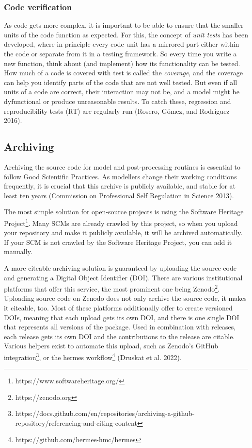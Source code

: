 \documentclass[preprint,11pt,5p]{elsarticle}
\begin{document}
\subsubsection{Code verification}\label{code-verification}

As code gets more complex, it is important to be able to ensure that the
smaller units of the code function as expected. For this, the concept of
\emph{unit tests} has been developed, where in principle every code unit
has a mirrored part either within the code or separate from it in a
testing framework. So every time you write a new function, think about
(and implement) how its functionality can be tested. How much of a code
is covered with test is called the \emph{coverage}, and the coverage can
help you identify parts of the code that are not well tested. But even
if all units of a code are correct, their interaction may not be, and a
model might be dyfunctional or produce unreasonable results. To catch
these, regression and reproducibility tests (RT) are regularly run
(Rosero, Gómez, and Rodríguez 2016).

\subsection{Archiving}\label{archiving}

Archiving the source code for model and post-processing routines is
essential to follow Good Scientific Practices. As modellers change their
working conditions frequently, it is crucial that this archive is
publicly available, and stable for at least ten years (Commission on
Professional Self Regulation in Science 2013).

The most simple solution for open-source projects is using the Software
Heritage Project\footnote{https://www.softwareheritage.org/}. Many SCMs
are already crawled by this project, so when you upload your repository
and make it publicly available, it will be archived automatically. If
your SCM is not crawled by the Software Heritage Project, you can add it
manually.

A more citeable archiving solution is guaranteed by uploading the source
code and generating a Digital Object Identifier (DOI). There are various
institutional platforms that offer this service, the most prominent one
being Zenodo\footnote{https://zenodo.org}. Uploading source code on
Zenodo does not only archive the source code, it makes it citeable, too.
Most of these platforms additionally offer to create versioned DOIs,
meaning that each upload gets its own DOI, and there is one single DOI
that represents all versions of the package. Used in combination with
releases, each release gets its own DOI and the contributions to the
release are citable. Various helpers exist to automate this upload, such
as Zenodo's GitHub integration\footnote{https://docs.github.com/en/repositories/archiving-a-github-repository/referencing-and-citing-content},
or the hermes workflow\footnote{https://github.com/hermes-hmc/hermes}
(Druskat et al. 2022).
\end{document}
